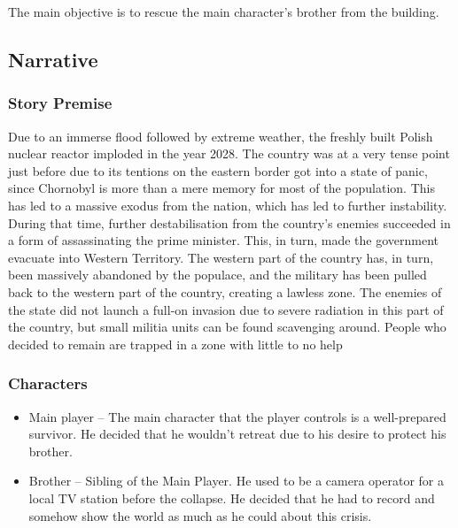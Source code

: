 The main objective is to rescue the main character's brother from the building. 











\subsection{Narrative}



\subsubsection{Story Premise}



Due to an immerse flood followed by extreme weather, the freshly built Polish nuclear reactor imploded in the year 2028. The country was at a very tense point just before due to its tentions on the eastern border got into a state of panic, since Chornobyl is more than a mere memory for most of the population. This has led to a massive exodus from the nation, which has led to further instability. During that time, further destabilisation from the country's enemies succeeded in a form of assassinating the prime minister. This, in turn, made the government evacuate into Western Territory. The western part of the country has, in turn, been massively abandoned by the populace, and the military has been pulled back to the western part of the country, creating a lawless zone. The enemies of the state did not launch a full-on invasion due to severe radiation in this part of the country, but small militia units can be found scavenging around. People who decided to remain are trapped in a zone with little to no help



\subsubsection{Characters}



\begin{itemize}



    \item Main player -- The main character that the player controls is a well-prepared survivor. He decided that he wouldn't retreat due to his desire to protect his brother.

    \item Brother -- Sibling of the Main Player. He used to be a camera operator for a local TV station before the collapse. 
    He decided that he had to record and somehow show the world as much as he could about this crisis.



\end{itemize}







